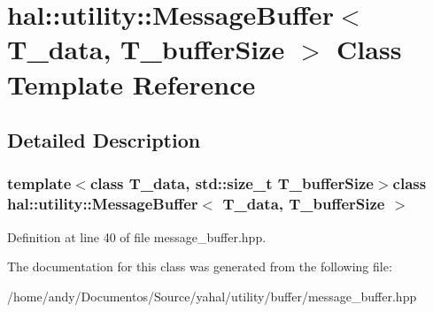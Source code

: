 \hypertarget{classhal_1_1utility_1_1_message_buffer}{}\section{hal\+:\+:utility\+:\+:Message\+Buffer$<$ T\+\_\+data, T\+\_\+buffer\+Size $>$ Class Template Reference}
\label{classhal_1_1utility_1_1_message_buffer}


\subsection{Detailed Description}
\subsubsection*{template$<$class T\+\_\+data, std\+::size\+\_\+t T\+\_\+buffer\+Size$>$class hal\+::utility\+::\+Message\+Buffer$<$ T\+\_\+data, T\+\_\+buffer\+Size $>$}



Definition at line 40 of file message\+\_\+buffer.\+hpp.



The documentation for this class was generated from the following file\+:\begin{DoxyCompactItemize}
\item 
/home/andy/\+Documentos/\+Source/yahal/utility/buffer/message\+\_\+buffer.\+hpp\end{DoxyCompactItemize}
